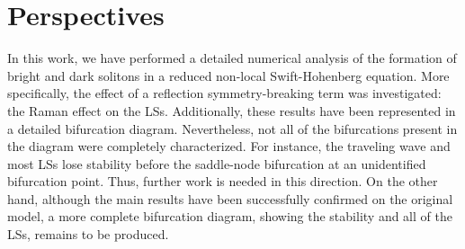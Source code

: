 

\section{Perspectives}

In this work, we have performed a detailed numerical analysis of the formation
of bright and dark solitons in a reduced non-local Swift-Hohenberg equation. More specifically,
the effect of a reflection symmetry-breaking term was investigated: the Raman effect on 
the LSs. Additionally, these results have been represented in a 
detailed bifurcation diagram. 
Nevertheless, not all of the bifurcations
present in the diagram were completely characterized.
For instance, the traveling 
wave and most LSs lose stability before the saddle-node bifurcation at an unidentified
bifurcation point. Thus, further work is needed in this direction.
 On the other hand, although the main results have been successfully
confirmed on the original model, a more complete bifurcation diagram, showing the stability and all of the LSs, 
remains
to be produced.
